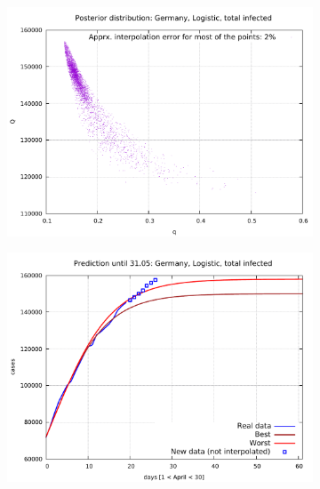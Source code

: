\documentclass[8pt]{article}
\begin{document}
\begin{figure}[h!]
  \centering
  \begin{subfigure}[b]{0.5\linewidth}
  \includegraphics[width=\linewidth]{../de_l_t/posterior.pdf}
  \end{subfigure}  \begin{subfigure}[b]{0.48\linewidth}
    \includegraphics[width=\linewidth]{../de_l_t/prediction.pdf}
  \end{subfigure}
  \begin{subfigure}[b]{0.48\linewidth}

\end{subfigure}
\end{figure}
\end{document}
